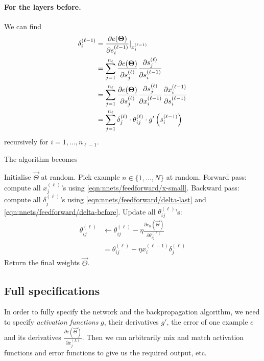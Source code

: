 \paragraph{For the layers before.} We can find
\begin{align}
    \delta_i^{(\ell - 1)}   &= \frac{\partial e(\boldsymbol{\mathbf{\Theta}})}{\partial s_i^{(\ell - 1)}}|_{x_i^{(\ell - 1)}} \\
                            &= \sum_{j = 1}^{n_\ell} \frac{\partial e(\boldsymbol{\mathbf{\Theta}})}{\partial s_j^{(\ell)}} \frac{\partial s_j^{(\ell)}}{\partial s_i^{(\ell - 1)}} \\
                            &= \sum_{j = 1}^{n_\ell} \frac{\partial e(\boldsymbol{\mathbf{\Theta}})}{\partial s_j^{(\ell)}} \frac{\partial s_j^{(\ell)}}{\partial x_i^{(\ell - 1)}} \frac{\partial x_i^{(\ell - 1)}}{\partial s_i^{(\ell - 1)}} \\
                            &= \sum_{j = 1}^{n_\ell} \delta_j^{(\ell)} \cdot \theta_{ij}^{(\ell)} \cdot g'\left(s_i^{(\ell - 1)}\right) \label{eqn:nnets/feedforward/delta-before}
\end{align}
recursively for $i = 1, \dotsc, n_{\ell - 1}$.

The algorithm becomes
\begin{algorithmbis}\label{alg:nnets/feedforward/backprop}
    \begin{algorithmic}[1]
        \State Initialise $\vec \Theta$ at random.
        \Repeat
            \State Pick example $n \in \{1, \dotsc, N\}$ at random.
            \State Forward pass: compute all $x_j^{(\ell)}$'s using \eqref{eqn:nnets/feedforward/x-small}.
            \State Backward pass: compute all $\delta_j^{(\ell)}$'s using \eqref{eqn:nnets/feedforward/delta-last} and \eqref{eqn:nnets/feedforward/delta-before}.
            \State Update all $\theta_{ij}^{(\ell)}$'s:
                \begin{align}
                    \theta_{ij}^{(\ell)}    &\leftarrow \theta_{ij}^{(\ell)} - \eta\frac{\partial e_n(\vec \Theta)}{\partial \theta_{ij}^{(\ell)}} \\
                                            &= \theta_{ij}^{(\ell)} - \eta x_i^{(\ell - 1)} \delta_j^{(\ell)}
                \end{align}
        \State Return the final weights $\vec \Theta$.
    \end{algorithmic}
\end{algorithmbis}

\subsection{Full specifications}
In order to fully specify the network and the backpropagation algorithm, we need to specify \emph{activation functions} $g$, their derivatives $g'$, the error of one example $e$ and its derivatives $\frac{\partial e(\vec \Theta)}{\partial x_j^{(L)}}$. Then we can arbitrarily mix and match activation functions and error functions to give us the required output, etc.

